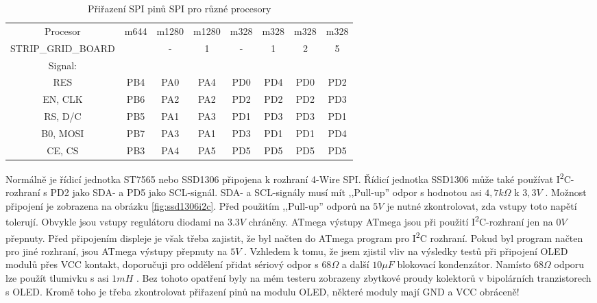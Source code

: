 \begin{table}[H]
  \begin{center}
    \begin{tabular}{| c || c | c | c | c | c | c | c |}
    \hline
 Procesor  & m644  & m1280 & m1280  & m328 & m328 & m328 & m328 \\
STRIP\_GRID\_BOARD &       &   -   &   1    &  -   &  1   &  2   &  5   \\
    \hline
    \hline
Signal:     &       &       &        &      &      &      &      \\
  RES       &  PB4  & PA0   &  PA4   & PD0  & PD4  & PD0  & PD2 \\
    \hline
  EN, CLK   &  PB6  & PA2   &  PA2   & PD2  & PD2  & PD2  & PD3 \\
    \hline
  RS, D/C   &  PB5  & PA1   &  PA3   & PD1  & PD3  & PD3  & PD1 \\
    \hline
  B0, MOSI  &  PB7  & PA3   &  PA1   & PD3  & PD1  & PD1  & PD4 \\
    \hline
  CE, CS    &  PB3  & PA4   &  PA5   & PD5  & PD5  & PD5  & PD5 \\
    \hline
    \end{tabular}
  \end{center}
  \caption{Přiřazení SPI pinů SPI pro různé procesory}
  \label{tab:spi-processor}
\end{table}

Normálně je řídicí jednotka ST7565 nebo SSD1306 připojena k rozhraní 4-Wire SPI.
Řídicí jednotka SSD1306 může také používat I\textsuperscript{2}C- rozhraní s PD2 jako SDA- a PD5 jako SCL-signál.
SDA- a SCL-signály musí mít ,,Pull-up'' odpor s hodnotou asi \(4,7k\Omega\) k \(3,3V\) .
Možnost připojení je zobrazena na obrázku \ref{fig:ssd1306i2c}.
Před použitím ,,Pull-up'' odporů na \(5V\) je nutné zkontrolovat, zda vstupy toto napětí tolerují.
Obvykle jsou vstupy regulátoru diodami na \(3.3V\) chráněny.
ATmega výstupy ATmega jsou při použití I\textsuperscript{2}C-rozhraní jen na  \(0V\) přepnuty.
Před připojením displeje je však třeba zajistit, že byl načten do ATmega program
pro I\textsuperscript{2}C rozhraní.
Pokud byl program načten pro jiné rozhraní, jsou ATmega výstupy přepnuty na \(5V\) .
Vzhledem k tomu, že jsem zjistil vliv na výsledky testů při připojení OLED modulů přes VCC kontakt,
doporučuji pro oddělení přidat sériový odpor s \(68\Omega\) a další \(10\mu F\) blokovací kondenzátor. 
Namísto \(68\Omega\) odporu lze použít tlumivku s asi \(1mH\) .
Bez tohoto opatření byly na mém testeru zobrazeny zbytkové proudy kolektorů v bipolárních tranzistorech s OLED.
Kromě toho je třeba zkontrolovat přiřazení pinů na modulu OLED, některé moduly mají GND a VCC obráceně!

